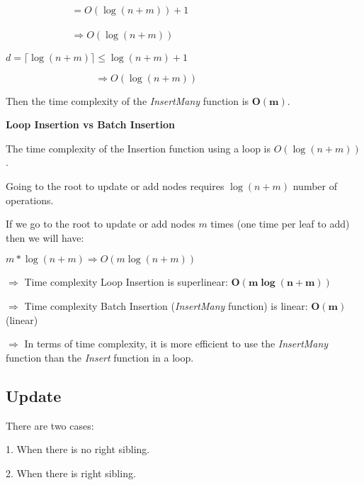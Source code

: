 \documentclass{article}
\begin{document}
\bigbreak

$\phantom{\sum_{k=0}^{d} 1 = \frac{a}{1-r}} = O(\log (n+m)) + 1$

\bigbreak

$\phantom{\sum_{k=0}^{d} 1 = \frac{a}{1-r}} \Rightarrow O(\log (n+m))$

\bigbreak

$d = \lceil \log (n+m) \rceil \leq \log (n+m) + 1$

\bigbreak

$\phantom{d = \lceil \log (n + m) \rceil} \Rightarrow O(\log (n+m))$

Then the time complexity of the \textit{InsertMany} function is $\boldsymbol{O(m)}$.

\bigbreak

\textbf{Loop Insertion vs Batch Insertion}

\bigbreak

The time complexity of the Insertion function using a loop is $O(\log (n+m))$.

\bigbreak

Going to the root to update or add nodes requires $ \log (n+m)$ number of operations.

If we go to the root to update or add nodes $m$ times (one time per leaf to add) then we will have:

\bigbreak

$m * \log (n+m) \Rightarrow \boxed{O(m \log (n+m))}$

\bigbreak

$\Rightarrow$ Time complexity Loop Insertion is superlinear: $\boldsymbol{O(m \log (n+m))}$

\bigbreak

$\Rightarrow$ Time complexity Batch Insertion (\textit{InsertMany} function) is linear: $\boldsymbol{O(m)}$ (linear)

\bigbreak

$\Rightarrow$ In terms of time complexity, it is more efficient to use the \textit{InsertMany} function than the \textit{Insert} function in a loop.

\bigbreak

\subsection{Update}

There are two cases:

1. When there is no right sibling.

2. When there is right sibling.
\end{document}
